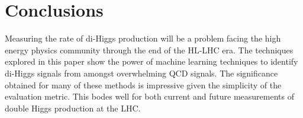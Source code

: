 \section{Conclusions}
\label{sec:conclusions}
Measuring the rate of di-Higgs production will be a problem facing the high energy physics community through the end of the HL-LHC era. The techniques explored in this paper show the power of machine learning techniques to identify di-Higgs signals from amongst overwhelming QCD signals. The significance obtained for many of these methods is impressive given the simplicity of the evaluation metric. This bodes well for both current and future measurements of double Higgs production at the LHC.

